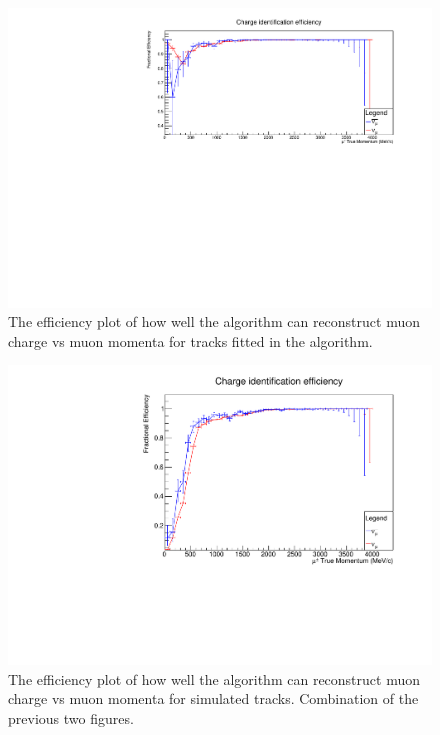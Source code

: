 \begin{figure}[h!]
\centering
\includegraphics[width=.9\textwidth]{figures/NeutrinoChap/Neutrino/NuStormChargeEff.pdf}
\caption{The efficiency plot of how well the algorithm can reconstruct muon charge vs muon momenta for tracks fitted in the algorithm.}
\label{fig:NuSTORMTASDfittedcharge}
\end{figure}

\begin{figure}[h!]
\centering
\includegraphics[width=.9\textwidth]{figures/NeutrinoChap/CombinedNuStormChargeFittedEff.pdf}
\caption{The efficiency plot of how well the algorithm can reconstruct muon charge vs muon momenta for simulated tracks. Combination of the previous two figures.}
\label{fig:NuSTORMTASDCombined}
\end{figure}

